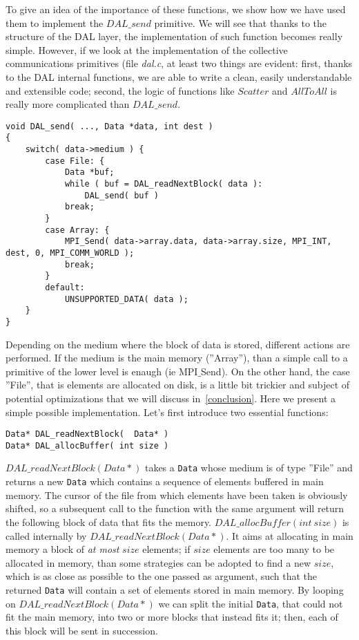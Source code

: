 To give an idea of the importance of these functions, we show how we have used them to implement the $DAL\_send$ primitive. We will see that thanks to the structure of the DAL layer, the implementation of such function becomes really simple. However, if we look at the implementation of the collective communications primitives (file \textit{dal.c}, at least two things are evident: first, thanks to the DAL internal functions, we are able to write a clean, easily understandable and extensible code; second, the logic of functions like $Scatter$ and $AllToAll$ is really more complicated than $DAL\_send$. 
\begin{lstlisting}
void DAL_send( ..., Data *data, int dest )
{
	switch( data->medium ) {
		case File: {
			Data *buf;
			while ( buf = DAL_readNextBlock( data ):
				DAL_send( buf )
			break;
		}
		case Array: {
			MPI_Send( data->array.data, data->array.size, MPI_INT, dest, 0, MPI_COMM_WORLD );
			break;
		}
		default:
			UNSUPPORTED_DATA( data );
	}
}
\end{lstlisting}
Depending on the medium where the block of data is stored, different actions are performed. If the medium is the main memory (''Array''), than a simple call to a primitive of the lower level is enaugh (ie MPI$\_$Send). On the other hand, the case ''File'', that is elements are allocated on disk, is a little bit trickier and subject of potential optimizations that we will discuss in~\ref{conclusion}. Here we present a simple possible implementation. Let's first introduce two essential functions: 
\begin{lstlisting}
Data* DAL_readNextBlock(  Data* )
Data* DAL_allocBuffer( int size )
\end{lstlisting}
$DAL\_readNextBlock( Data* )$ takes a \texttt{Data} whose medium is of type ''File'' and returns a new \texttt{Data} which contains a sequence of elements buffered in main memory. The cursor of the file from which elements have been taken is obviously shifted, so a subsequent call to the function with the same argument will return the following block of data that fits the memory. $DAL\_allocBuffer( int\ size )$ is called internally by $DAL\_readNextBlock( Data* )$. It aims at allocating in main memory a block of \textit{at most} $size$ elements; if $size$ elements are too many to be allocated in memory, than some strategies can be adopted to find a new $size$, which is as close as possible to the one passed as argument, such that the returned \texttt{Data} will contain a set of elements stored in main memory. 
By looping on $DAL\_readNextBlock( Data* )$ we can split the initial \texttt{Data}, that could not fit the main memory, into two or more blocks that instead fits it; then, each of this block will be sent in succession.
